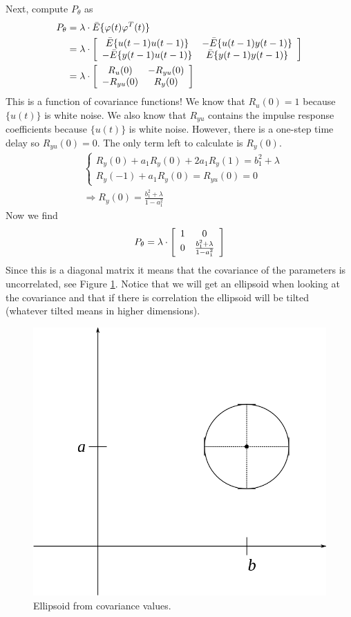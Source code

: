 \begin{example}
Next, compute $P_\theta$ as
\begin{align*}
P_\theta &= \lambda\cdot \bar{E}\{\varphi(t)\varphi^T(t)\} \\
&= \lambda\cdot \left[\begin{array}{c c}
\bar{E}\{u(t-1)u(t-1)\} & -\bar{E}\{u(t-1)y(t-1)\} \\
-\bar{E}\{y(t-1)u(t-1)\} & \bar{E}\{y(t-1)y(t-1)\}
\end{array}\right] \\
&= \lambda\cdot \left[\begin{array}{c c}
R_u(0) & -R_{yu}(0) \\ -R_{yu}(0) & R_y(0)
\end{array}\right]
\end{align*}
This is a function of covariance functions! We know that $R_u(0)=1$ because $\{u(t)\}$ is white noise. We also know that $R_{yu}$ contains the impulse response coefficients because $\{u(t)\}$ is white noise. However, there is a one-step time delay so $R_{yu}(0) = 0$. The only term left to calculate is $R_y(0)$.
\begin{align*}
&\begin{cases} R_y(0) + a_1R_y(0)+2a_1R_y(1) = b_1^2+\lambda \\ R_y(-1)+a_1R_y(0) = R_{yu}(0) = 0 \end{cases} \\
&\Rightarrow R_y(0) = \frac{b_1^2+\lambda}{1-a_1^2}
\end{align*}
Now we find
$$P_\theta = \lambda\cdot \left[\begin{array}{c c} 1 & 0 \\ 0 & \frac{b_1^2+\lambda}{1-a_1^2} \end{array}\right]$$
Since this is a diagonal matrix it means that the covariance of the parameters is uncorrelated, see Figure \ref{fig:15ellipsoid}. Notice that we will get an ellipsoid when looking at the covariance and that if there is correlation the ellipsoid will be tilted (whatever tilted means in higher dimensions).

\begin{figure}[ht!]
	\centering
	\includegraphics[width=.25\textwidth]{images/15ellipsoid}
	\caption{Ellipsoid from covariance values.}
	\label{fig:15ellipsoid}
\end{figure}


\end{example}
